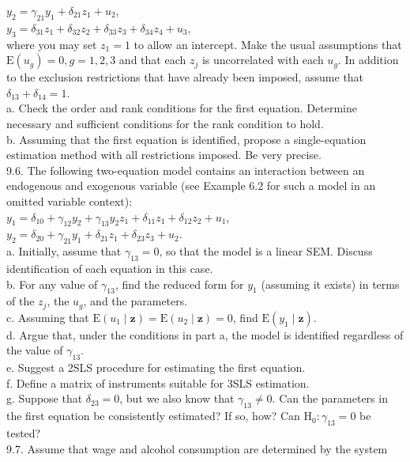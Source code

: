 \documentclass[10pt]{article}
\begin{document}
$y_{2}=\gamma_{21} y_{1}+\delta_{21} z_{1}+u_{2}$,\\
$y_{3}=\delta_{31} z_{1}+\delta_{32} z_{2}+\delta_{33} z_{3}+\delta_{34} z_{4}+u_{3}$,\\
where you may set $z_{1}=1$ to allow an intercept. Make the usual assumptions that $\mathrm{E}\left(u_{g}\right)=0, g=1,2,3$ and that each $z_{j}$ is uncorrelated with each $u_{g}$. In addition to the exclusion restrictions that have already been imposed, assume that $\delta_{13}+\delta_{14}=1$.\\
a. Check the order and rank conditions for the first equation. Determine necessary and sufficient conditions for the rank condition to hold.\\
b. Assuming that the first equation is identified, propose a single-equation estimation method with all restrictions imposed. Be very precise.\\
9.6. The following two-equation model contains an interaction between an endogenous and exogenous variable (see Example 6.2 for such a model in an omitted variable context):\\
$y_{1}=\delta_{10}+\gamma_{12} y_{2}+\gamma_{13} y_{2} z_{1}+\delta_{11} z_{1}+\delta_{12} z_{2}+u_{1}$,\\
$y_{2}=\delta_{20}+\gamma_{21} y_{1}+\delta_{21} z_{1}+\delta_{23} z_{3}+u_{2}$.\\
a. Initially, assume that $\gamma_{13}=0$, so that the model is a linear SEM. Discuss identification of each equation in this case.\\
b. For any value of $\gamma_{13}$, find the reduced form for $y_{1}$ (assuming it exists) in terms of the $z_{j}$, the $u_{g}$, and the parameters.\\
c. Assuming that $\mathrm{E}\left(u_{1} \mid \mathbf{z}\right)=\mathrm{E}\left(u_{2} \mid \mathbf{z}\right)=0$, find $\mathrm{E}\left(y_{1} \mid \mathbf{z}\right)$.\\
d. Argue that, under the conditions in part a, the model is identified regardless of the value of $\gamma_{13}$.\\
e. Suggest a 2SLS procedure for estimating the first equation.\\
f. Define a matrix of instruments suitable for 3SLS estimation.\\
g. Suppose that $\delta_{23}=0$, but we also know that $\gamma_{13} \neq 0$. Can the parameters in the first equation be consistently estimated? If so, how? Can $\mathrm{H}_{0}: \gamma_{13}=0$ be tested?\\
9.7. Assume that wage and alcohol consumption are determined by the system\\
\end{document}
